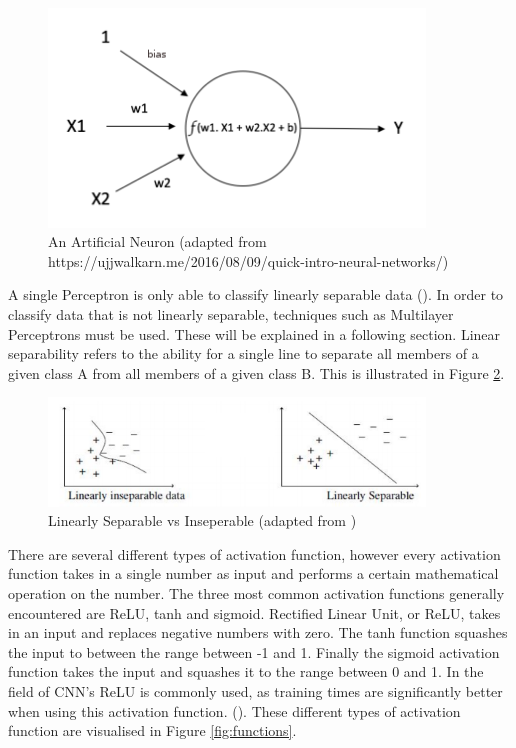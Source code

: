 \documentclass[12pt]{report}
\begin{document}
\vspace{0.5cm}
\begin{figure}[ht!]
	\centering
	\includegraphics[width=10cm]{neuron}
	\caption{An Artificial Neuron (adapted from https://ujjwalkarn.me/2016/08/09/quick-intro-neural-networks/)}
	\label{fig:neuron}
\end{figure}

\begin{flushleft}
A single Perceptron is only able to classify linearly separable data (\cite{kotsiantis2007supervised}). In order to classify data that is not linearly separable, techniques such as Multilayer Perceptrons must be used. These will be explained in a following section. Linear separability refers to the ability for a single line to separate all members of a given class A from all members of a given class B. This is illustrated in Figure \ref{fig:linear}.
\end{flushleft}

\vspace{0.5cm}
\begin{figure}[ht!]
	\centering
	\includegraphics[width=10cm]{seperable}
	\caption{Linearly Separable vs Inseperable (adapted from \cite{mohamed2017comparative})}
	\label{fig:linear}
\end{figure}

\begin{flushleft}
There are several different types of activation function, however every activation function takes in a single number as input and performs a certain mathematical operation on the number. The three most common activation functions generally encountered are ReLU, tanh and sigmoid. Rectified Linear Unit, or ReLU, takes in an input and replaces negative numbers with zero. The tanh function squashes the input to between the range between -1 and 1. Finally the sigmoid activation function takes the input and squashes it to the range between 0 and 1. In the field of CNN's ReLU is commonly used, as training times are significantly better when using this activation function. (\cite{krizhevsky2012imagenet}). These different types of activation function are visualised in Figure \ref{fig:functions}.
\end{flushleft}
\end{document}

